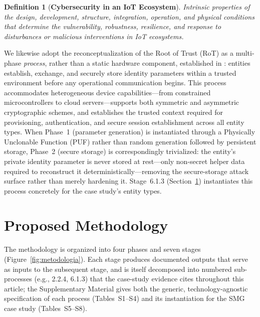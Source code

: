 \documentclass[preprint,12pt,authoryear]{elsarticle}
\newtheorem{definitions}{Definition}
\begin{document}
\begin{definitions}[\textbf{Cybersecurity in an IoT Ecosystem}]
\textit{Intrinsic properties of the design, development, structure, integration, operation, and physical conditions that determine the vulnerability, robustness, resilience, and response to disturbances or malicious interventions in IoT ecosystems.}
\end{definitions}

We likewise adopt the reconceptualization of the Root of Trust (RoT) as a multi-phase \emph{process}, rather than a static hardware component, established in \citet{campos2026identity}: entities establish, exchange, and securely store identity parameters within a trusted environment before any operational communication begins. This process accommodates heterogeneous device capabilities---from constrained microcontrollers to cloud servers---supports both symmetric and asymmetric cryptographic schemes, and establishes the trusted context required for provisioning, authentication, and secure session establishment across all entity types. When Phase~1 (parameter generation) is instantiated through a Physically Unclonable Function (PUF) rather than random generation followed by persistent storage, Phase~2 (secure storage) is correspondingly trivialized: the entity's private identity parameter is never stored at rest---only non-secret helper data required to reconstruct it deterministically---removing the secure-storage attack surface rather than merely hardening it. Stage~6.1.3 (Section~\ref{sec:methodology}) instantiates this process concretely for the case study's entity types.


\section{Proposed Methodology}
\label{sec:methodology}

The methodology is organized into four phases and seven stages (Figure~\ref{fig:metodologia}). Each stage produces documented outputs that serve as inputs to the subsequent stage, and is itself decomposed into numbered sub-processes (e.g., 2.2.4, 6.1.3) that the case-study evidence cites throughout this article; the Supplementary Material gives both the generic, technology-agnostic specification of each process (Tables~S1--S4) and its instantiation for the SMG case study (Tables~S5--S8).
\end{document}
